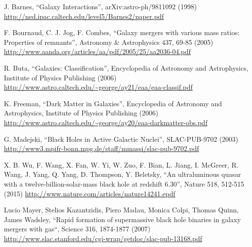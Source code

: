 \documentclass[11pt]{article}
\begin{document}
\begin{thebibliography}{99}
 J.  Barnes, ``Galaxy Interactions'', arXiv:astro-ph/9811092 (1998) \url{http://ned.ipac.caltech.edu/level5/Barnes2/paper.pdf}

 F. Bournaud, C. J. Jog, F. Combes, ``Galaxy mergers with various mass ratios: Properties of remnants'', Astronomy \& Astrophysics 437, 69-85 (2005) \url{http://www.aanda.org/articles/aa/pdf/2005/25/aa2036-04.pdf}

 R. Buta, ``Galaxies: Classification'', Encyclopedia of Astronomy and Astrophysics, Institute of Physics Publishing (2006) \url{http://www.astro.caltech.edu/~george/ay21/eaa/eaa-classif.pdf}
	
 K. Freeman, ``Dark Matter in Galaxies'', Encyclopedia of Astronomy and Astrophysics, Institute of Physics Publishing (2006) \url{http://www.astro.caltech.edu/~george/ay20/eaa-darkmatter-obs.pdf}

 G. Madejski, ``Black Holes in Active Galactic Nuclei'', SLAC-PUB-9702 (2003) \url{http://www3.mpifr-bonn.mpg.de/staff/mmassi/slac-pub-9702.pdf}

 X. B. Wu, F. Wang, X. Fan, W. Yi,	W. Zuo, F. Bian, L. Jiang, I. McGreer, R. Wang,	J. Yang, Q. Yang, D. Thompson, Y. Beletsky, ``An ultraluminous quasar with a twelve-billion-solar-mass black hole at redshift 6.30'', Nature 518, 512-515 (2015) \url{http://www.nature.com/articles/nature14241.epdf}

 Lucio Mayer, Stelios Kazantzidis, Piero Madau, Monica Colpi, Thomas Quinn, James Wadsley, ``Rapid formation of supermassive black hole binaries
in galaxy mergers with gas``, Science 316, 1874-1877 (2007) \url{http://www.slac.stanford.edu/cgi-wrap/getdoc/slac-pub-13168.pdf}

\end{thebibliography}

\end{document}
